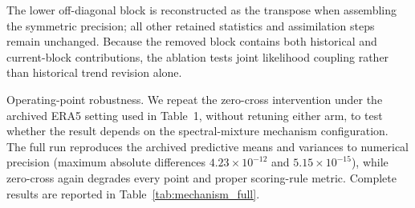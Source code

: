 The lower off-diagonal block is reconstructed as the transpose when assembling the symmetric precision; all other retained statistics and assimilation steps remain unchanged. Because the removed block contains both historical and current-block contributions, the ablation tests joint likelihood coupling rather than historical trend revision alone.

Operating-point robustness. We repeat the zero-cross intervention under the archived ERA5 setting used in Table~1, without retuning either arm, to test whether the result depends on the spectral-mixture mechanism configuration. The full run reproduces the archived predictive means and variances to numerical precision (maximum absolute differences $4.23\times10^{-12}$ and $5.15\times10^{-15}$), while zero-cross again degrades every point and proper scoring-rule metric. Complete results are reported in Table~\ref{tab:mechanism_full}.

